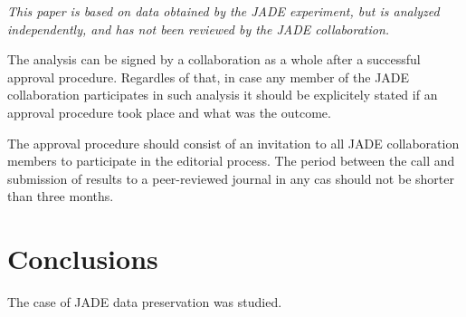{\it This paper is based on data obtained by the JADE experiment, but is analyzed
independently, and has not been reviewed by the JADE collaboration. }

The analysis can be signed by a collaboration as a whole after a successful approval procedure.
Regardles of that, in case any  member of the JADE collaboration participates 
in such analysis it should be explicitely stated 
if an approval procedure took place and what was the outcome.

The approval procedure should consist of an invitation to all JADE collaboration members 
to participate in the editorial process. The period between the call and  submission of results to a peer-reviewed journal
in any cas should not be shorter than three months.



\section{Conclusions}
The case of JADE data preservation was studied.



